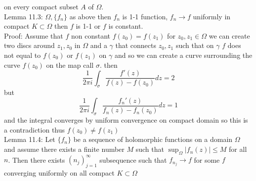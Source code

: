\documentclass[11pt]{article}
\begin{document}
on every compact subset $A$ of  $\Omega$.\\
Lemma 11.3: $\Omega, \{f_n\}$ as above then  $f_n$ is 1-1 function,  $f_n \to f$ uniformly in compact  $ K \subset \Omega$ then $f$ is 1-1 or  $f$ is constant.\\
Proof: Assume that $f$ non constant $f(z_0) = f(z_1)$ for $z_0, z_1 \in \Omega$ we can create two discs around $z_1,z_0$ in $\Omega$ and a  $\gamma$ that connects $z_0,z_1$ such that on $\gamma$ $f$ does not equal to  $f(z_0)$ or $f(z_1)$ on $\gamma$
and so we can create a curve surrounding the curve $f(z_0)$ on the map call $\sigma$.
then
\[
\frac{1}{2\pi i} \int_{\sigma}^{} \frac{f'(z)}{f(z) - f(z_0)}dz = 2
\] 
but
\[
\frac{1}{2\pi i} \int_{ \sigma}^{} \frac{f_n'(z)}{f_n(z) - f_n(z_0)}dz = 1
\] 
and the integral converges by uniform convergence on compact domain so this is a contradiction thus $f(z_0) \ne f(z_1)$ \\
Lemma 11.4: 
Let $\{f_n\}$ be a sequence of holomorphic functions on a domain  $\Omega$ and assume there exists a finite number  $M$ such that  $\sup_{\Omega}|f_n(z)| \le M$ for all  $n$.
Then there exists  $(n_j)_{j=1}^{\infty}$ subsequence such that $f_{n_j} \to f$ for some  $f$ converging uniformly on all compact  $K \subset \Omega$
\end{document}
